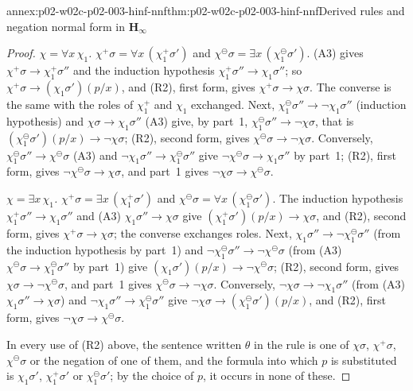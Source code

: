 \begin{annexitem}{annex:p02-w02c-p02-003-hinf-nnf}{thm:p02-w02c-p02-003-hinf-nnf}{Derived rules and negation normal form in \(\mathbf H_{\infty}\)}
\begin{proof}
\emph{\(\chi=\forall x\,\chi_1\).}  \(\chi^{+}\sigma=\forall x\,
(\chi_1^{+}\sigma')\) and \(\chi^{\ominus}\sigma=\exists x\,
(\chi_1^{\ominus}\sigma')\).  (A3) gives \(\chi^{+}\sigma\to\chi_1^{+}
\sigma''\) and the induction hypothesis \(\chi_1^{+}\sigma''\to\chi_1
\sigma''\); so \(\chi^{+}\sigma\to(\chi_1\sigma')(p/x)\), and (R2), first
form, gives \(\chi^{+}\sigma\to\chi\sigma\).  The converse is the same with
the roles of \(\chi_1^{+}\) and \(\chi_1\) exchanged.  Next,
\(\chi_1^{\ominus}\sigma''\to\neg\chi_1\sigma''\) (induction hypothesis)
and \(\chi\sigma\to\chi_1\sigma''\) (A3) give, by part~1,
\(\chi_1^{\ominus}\sigma''\to\neg\chi\sigma\), that is
\((\chi_1^{\ominus}\sigma')(p/x)\to\neg\chi\sigma\); (R2), second form,
gives \(\chi^{\ominus}\sigma\to\neg\chi\sigma\).  Conversely,
\(\chi_1^{\ominus}\sigma''\to\chi^{\ominus}\sigma\) (A3) and
\(\neg\chi_1\sigma''\to\chi_1^{\ominus}\sigma''\) give
\(\neg\chi^{\ominus}\sigma\to\chi_1\sigma''\) by part~1; (R2), first form,
gives \(\neg\chi^{\ominus}\sigma\to\chi\sigma\), and part~1 gives
\(\neg\chi\sigma\to\chi^{\ominus}\sigma\).

\emph{\(\chi=\exists x\,\chi_1\).}  \(\chi^{+}\sigma=\exists x\,
(\chi_1^{+}\sigma')\) and \(\chi^{\ominus}\sigma=\forall x\,
(\chi_1^{\ominus}\sigma')\).  The induction hypothesis
\(\chi_1^{+}\sigma''\to\chi_1\sigma''\) and (A3)
\(\chi_1\sigma''\to\chi\sigma\) give \((\chi_1^{+}\sigma')(p/x)\to
\chi\sigma\), and (R2), second form, gives \(\chi^{+}\sigma\to\chi\sigma\);
the converse exchanges roles.  Next, \(\chi_1\sigma''\to\neg\chi_1^{\ominus}
\sigma''\) (from the induction hypothesis by part~1) and
\(\neg\chi_1^{\ominus}\sigma''\to\neg\chi^{\ominus}\sigma\) (from (A3)
\(\chi^{\ominus}\sigma\to\chi_1^{\ominus}\sigma''\) by part~1) give
\((\chi_1\sigma')(p/x)\to\neg\chi^{\ominus}\sigma\); (R2), second form,
gives \(\chi\sigma\to\neg\chi^{\ominus}\sigma\), and part~1 gives
\(\chi^{\ominus}\sigma\to\neg\chi\sigma\).  Conversely,
\(\neg\chi\sigma\to\neg\chi_1\sigma''\) (from (A3) \(\chi_1\sigma''\to
\chi\sigma\)) and \(\neg\chi_1\sigma''\to\chi_1^{\ominus}\sigma''\) give
\(\neg\chi\sigma\to(\chi_1^{\ominus}\sigma')(p/x)\), and (R2), first form,
gives \(\neg\chi\sigma\to\chi^{\ominus}\sigma\).

In every use of (R2) above, the sentence written \(\theta\) in the rule is one
of \(\chi\sigma\), \(\chi^{+}\sigma\), \(\chi^{\ominus}\sigma\) or the negation
of one of them, and the formula into which \(p\) is substituted is
\(\chi_1\sigma'\), \(\chi_1^{+}\sigma'\) or \(\chi_1^{\ominus}\sigma'\); by the
choice of \(p\), it occurs in none of these.
\end{proof}
\end{annexitem}

